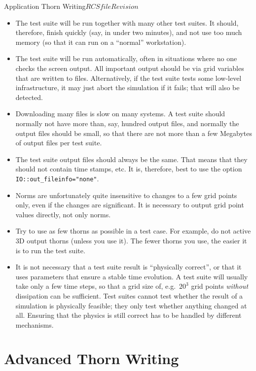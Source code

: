 \begin{cactuspart}{Application Thorn Writing}{$RCSfile$}{$Revision$}
\begin{itemize}
\item The test suite will be run together with many other test
  suites.  It should, therefore, finish quickly (say, in under two
  minutes), and not use too much memory (so that it can run on a
  ``normal'' workstation).
\item The test suite will be run automatically, often in situations
  where no one checks the screen output.  All important output should
  be via grid variables that are written to files.  Alternatively, if
  the test suite tests some low-level infrastructure, it may just
  abort the simulation if it fails; that will also be detected.
\item Downloading many files is slow on many systems.  A test suite
  should normally not have more than, say, hundred output files, and
  normally the output files should be small, so that there are not
  more than a few Megabytes of output files per test suite.
\item The test suite output files should always be the same.  That
  means that they should not contain time stamps, etc.  It is,
  therefore, best to use the option \verb|IO::out_fileinfo="none"|.
\item Norms are unfortunately quite insensitive to changes to a few
  grid points only, even if the changes are significant.  It is
  necessary to output grid point values directly, not only norms.
\item Try to use as few thorns as possible in a test case.  For example, do
  not active 3D output thorns (unless you use it).  The fewer thorns
  you use, the easier it is to run the test suite.
\item It is not necessary that a test suite result is ``physically
  correct'', or that it uses parameters that ensure a stable time
  evolution.  A test suite will usually take only a few time steps, so
  that a grid size of, e.g.\ $20^3$ grid points \emph{without}
  dissipation can be sufficient.  Test suites cannot test whether the
  result of a simulation is physically feasible; they only test
  whether anything changed at all.  Ensuring that the physics is still
  correct has to be handled by different mechanisms.
\end{itemize}


\chapter{Advanced Thorn Writing}


\end{cactuspart}
